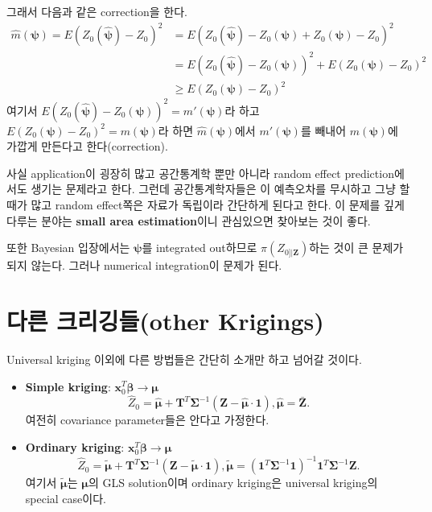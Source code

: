 \documentclass[b5paper,]{book}
\theoremstyle{definition}
\theoremstyle{definition}
\theoremstyle{definition}
\theoremstyle{remark}
\begin{document}
그래서 다음과 같은 correction을 한다. \[
\begin{aligned}
\hat{m}(\boldsymbol{\psi})=E(Z_{0}(\hat{\boldsymbol{\psi}})-Z_{0})^{2}&=E(Z_{0}(\hat{\boldsymbol{\psi}})-Z_{0}(\boldsymbol{\psi})+Z_{0}(\boldsymbol{\psi})-Z_{0})^2\\
&=E(Z_{0}(\hat{\boldsymbol{\psi}})-Z_{0}(\boldsymbol{\psi}))^{2}+E(Z_{0}(\boldsymbol{\psi})-Z_{0})^2\\
&\geq E(Z_{0}(\boldsymbol{\psi})-Z_{0})^2
\end{aligned}
\] 여기서
\(E(Z_{0}(\hat{\boldsymbol{\psi}})-Z_{0}(\boldsymbol{\psi}))^{2}=m'(\boldsymbol{\psi})\)라
하고 \(E(Z_{0}(\boldsymbol{\psi})-Z_{0})^2=m(\boldsymbol{\psi})\)라 하면
\(\hat{m}(\boldsymbol{\psi})\)에서 \(m'(\boldsymbol{\psi})\)를 빼내어
\(m(\boldsymbol{\psi})\)에 가깝게 만든다고 한다(correction).

사실 application이 굉장히 많고 공간통계학 뿐만 아니라 random effect
prediction에서도 생기는 문제라고 한다. 그런데 공간통계학자들은 이
예측오차를 무시하고 그냥 할 때가 많고 random effect쪽은 자료가 독립이라
간단하게 된다고 한다. 이 문제를 깊게 다루는 분야는 \textbf{small area
estimation}이니 관심있으면 찾아보는 것이 좋다.

또한 Bayesian 입장에서는 \(\boldsymbol{\psi}\)를 integrated out하므로
\(\pi(Z_{0]|\mathbf{Z}})\)하는 것이 큰 문제가 되지 않는다. 그러나
numerical integration이 문제가 된다.

\section{다른 크리깅들(other Krigings)}\label{-other-krigings}

Universal kriging 이외에 다른 방법들은 간단히 소개만 하고 넘어갈 것이다.

\begin{itemize}
\item
  \textbf{Simple kriging}:
  \(\mathbf{x}_{0}^{T}\boldsymbol{\beta} \rightarrow \boldsymbol{\mu}\)
  \[\hat{Z}_{0}=\hat{\boldsymbol{\mu}}+\mathbf{T}^{T}\boldsymbol{\Sigma}^{-1}(\mathbf{Z}-\hat{\boldsymbol{\mu}}\cdot \mathbf{1}), \hat{\mathbf{\mu}}=\bar{\mathbf{Z}}.\]
  여전히 covariance parameter들은 안다고 가정한다.
\item
  \textbf{Ordinary kriging}:
  \(\mathbf{x}_{0}^{T}\boldsymbol{\beta} \rightarrow \boldsymbol{\mu}\)
  \[\hat{Z}_{0}=\tilde{\boldsymbol{\mu}}+\mathbf{T}^{T}\boldsymbol{\Sigma}^{-1}(\mathbf{Z}-\tilde{\boldsymbol{\mu}}\cdot \mathbf{1}), \tilde{\boldsymbol{\mu}}=(\mathbf{1}^{T}\boldsymbol{\Sigma}^{-1}\mathbf{1})^{-1}\mathbf{1}^{T}\boldsymbol{\Sigma}^{-1}\mathbf{Z}.\]
  여기서 \(\tilde{\boldsymbol{\mu}}\)는 \(\boldsymbol{\mu}\)의 GLS
  solution이며 ordinary kriging은 universal kriging의 special case이다.
\end{itemize}
\end{document}
